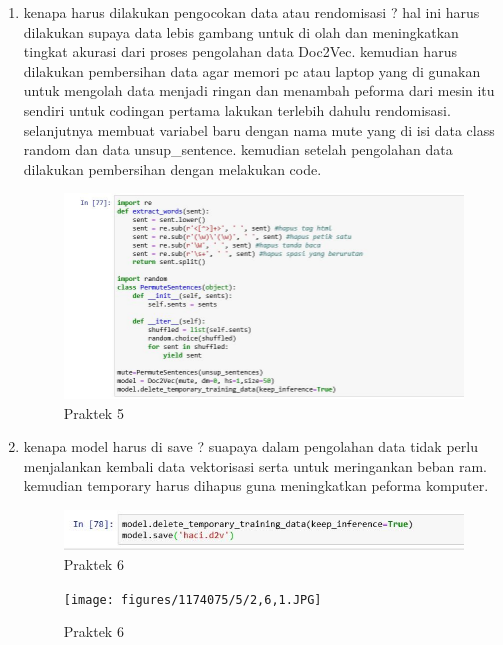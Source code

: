 \begin{enumerate}
\item kenapa harus dilakukan pengocokan data atau rendomisasi ? hal ini harus dilakukan supaya data lebis gambang untuk di olah dan meningkatkan tingkat akurasi dari proses pengolahan data Doc2Vec. kemudian harus dilakukan pembersihan data agar memori pc atau laptop yang di gunakan untuk mengolah data menjadi ringan dan menambah peforma dari mesin itu sendiri untuk codingan pertama lakukan terlebih dahulu rendomisasi. selanjutnya membuat variabel baru dengan nama mute yang di isi data class random dan data unsup\_sentence. kemudian setelah pengolahan data dilakukan pembersihan dengan melakukan code.
\begin{figure}[ht]
\centering
\includegraphics[scale=0.6]{figures/1174075/5/2,5.JPG}
\caption{Praktek 5}
\label{contoh}
\end{figure}


\item kenapa model harus di save ? suapaya dalam pengolahan data tidak perlu menjalankan kembali data vektorisasi serta untuk meringankan beban ram. kemudian temporary harus dihapus guna meningkatkan peforma komputer.
\begin{figure}[ht]
\centering
\includegraphics[scale=0.6]{figures/1174075/5/2,6.JPG}
\caption{Praktek 6}
\label{contoh}
\end{figure}


\begin{figure}[ht]
\centering
\texttt{[image: figures/1174075/5/2,6,1.JPG]}
\caption{Praktek 6}
\label{contoh}
\end{figure}



\end{enumerate}
